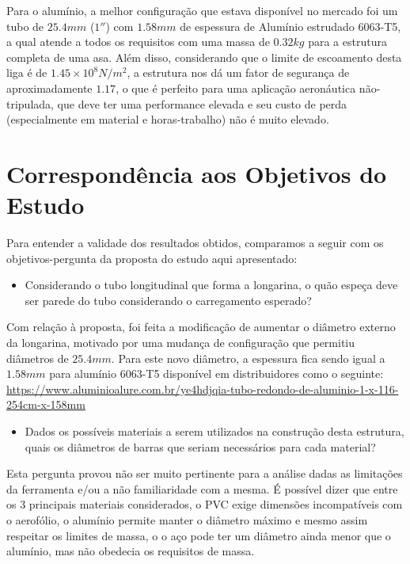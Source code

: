 \documentclass[a4paper]{article}
\begin{document}
Para o alumínio, a melhor configuração que estava disponível no mercado foi um tubo de $25.4 mm$ ($1''$) com $1.58 mm$ de espessura de Alumínio estrudado 6063-T5, a qual atende a todos os requisitos com uma massa de $0.32 kg$ para a estrutura completa de uma asa. Além disso, considerando que o limite de escoamento desta liga é de $1.45 \times 10^8 N/m^2$, a estrutura nos dá um fator de segurança de aproximadamente $1.17$, o que é perfeito para uma aplicação aeronáutica não-tripulada, que deve ter uma performance elevada e seu custo de perda (especialmente em material e horas-trabalho) não é muito elevado.

\section{Correspondência aos Objetivos do Estudo}

Para entender a validade dos resultados obtidos, comparamos a seguir com os objetivos-pergunta da proposta do estudo aqui apresentado:

\begin{itemize}
    \item Considerando o tubo longitudinal que forma a longarina, o quão espeça deve ser parede do tubo considerando o carregamento esperado?
\end{itemize}

\noindent Com relação à proposta, foi feita a modificação de aumentar o diâmetro externo da longarina, motivado por uma mudança de configuração que permitiu diâmetros de $25.4mm$. Para este novo diâmetro, a espessura fica sendo igual a $1.58mm$ para alumínio 6063-T5 disponível em distribuidores como o seguinte: \url{https://www.aluminioalure.com.br/ye4hdjqia-tubo-redondo-de-aluminio-1-x-116-254cm-x-158mm}

\begin{itemize}
    \item Dados os possíveis materiais a serem utilizados na construção desta estrutura, quais os diâmetros de barras que seriam necessários para cada material?
\end{itemize}

\noindent Esta pergunta provou não ser muito pertinente para a análise dadas as limitações da ferramenta e/ou a não familiaridade com a mesma. É possível dizer que entre os 3 principais materiais considerados, o PVC exige dimensões incompatíveis com o aerofólio, o alumínio permite manter o diâmetro máximo e mesmo assim respeitar os limites de massa, o o aço pode ter um diâmetro ainda menor que o alumínio, mas não obedecia os requisitos de massa.
\end{document}
